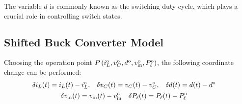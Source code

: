 The variable $d$ is commonly known as the switching duty cycle, which plays a crucial role in controlling switch states.

\subsection{Shifted Buck Converter Model}

Choosing the operation point $P\,(i_L^{\rm o}, v_C^{\rm o}, d^{\rm o}, v_{\rm in}^{\rm o}, P_{\ell}^{\rm o})$, the following coordinate change can be performed:
\begin{gather}
  \begin{align}
    \delta i_L(t) & = i_L(t) - i_L^{\rm o}, &
    \delta v_C(t) & = v_C(t) - v_C^{\rm o}, &
    \delta d(t)   & = d(t) - d^{\rm o}
  \end{align} \\
  \begin{align}
    \delta v_{\rm in}(t) & = v_{\rm in}(t) - v_{\rm in}^{\rm o} &
    \delta P_{\ell}(t)   & = P_{\ell}(t) - P_{\ell}^{\rm o}
  \end{align}
\end{gather}

